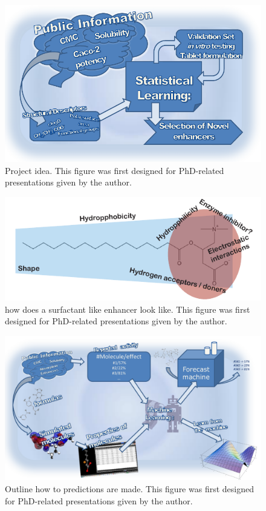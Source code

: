\begin{figure}[htbp]
\label{workSummary}
\includegraphics{graphics/workSummary_130mm.pdf}
\caption{Project idea. This figure was first designed for PhD-related presentations given by the author.}
\end{figure}

\begin{figure}[ht]
\label{devel_fassif}
\includegraphics{graphics/typeOfSurfactant.pdf}
\caption{how does a surfactant like enhancer look like. This figure was first designed for PhD-related presentations given by the author.}
\end{figure}

\begin{figure}[ht]
\label{devel_fassif}
\includegraphics[width=\textwidth, height=\textheight, keepaspectratio]{graphics/predictPotencySummary.pdf}
\caption{Outline how to predictions are made. This figure was first designed for PhD-related presentations given by the author.}
\end{figure}

